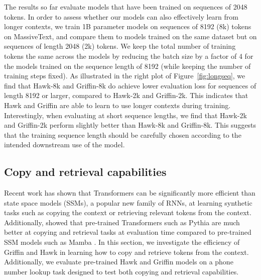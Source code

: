 \documentclass[11pt, a4paper, logo, onecolumn]{googledeepmind}
\theoremstyle{definition}
\begin{document}
The results so far evaluate models that have been trained on sequences of 2048 tokens. 
In order to assess whether our models can also effectively learn from longer contexts, we train 1B parameter models on sequences of 8192 (8k) tokens on MassiveText, and compare them to models trained on the same dataset but on sequences of length 2048 (2k) tokens. 
We keep the total number of training tokens the same across the models by reducing the batch size by a factor of 4 for the models trained on the sequence length of 8192 (while keeping the number of training steps fixed).
As illustrated in the right plot of Figure~\ref{fig:longseq}, we find that Hawk-8k and Griffin-8k do achieve lower evaluation loss for sequences of length 8192 or larger, compared to Hawk-2k and Griffin-2k. 
This indicates that Hawk and Griffin are able to learn to use longer contexts during training. 
Interestingly, when evaluating at short sequence lengths, we find that Hawk-2k and Griffin-2k perform slightly better than Hawk-8k and Griffin-8k. 
This suggests that the training sequence length should be carefully chosen according to the intended downstream use of the model.
















\subsection{Copy and retrieval capabilities}

Recent work \citep{jelassi2024repeat} has shown that Transformers can be significantly more efficient than state space models (SSMs), a popular new family of RNNs, at learning synthetic tasks such as copying the context or retrieving relevant tokens from the context. Additionally, \citet{jelassi2024repeat} showed that pre-trained Transformers such as Pythia \citep{biderman2023pythia} are much better at copying and retrieval tasks at evaluation time compared to pre-trained SSM models such as Mamba \citep{gu2023mamba}. In this section, we investigate the efficiency of Griffin and Hawk in learning how to copy and retrieve tokens from the context. Additionally, we evaluate pre-trained Hawk and Griffin models on a phone number lookup task designed to test both copying and retrieval capabilities.
\end{document}
